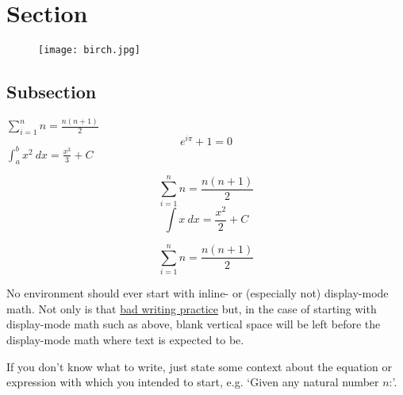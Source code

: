 \section{Section}

\lipsum[1-2]

\begin{figure}[h]
    \centering
    \texttt{[image: birch.jpg]}
\end{figure}

\subsection{Subsection}

\lipsum[][1-9]

\begin{defn}
    \lipsum[][1] \(\sum_{i=1}^{n} n = \frac{n(n+1)}{2}\) \lipsum[][2-3]
    \[e^{i\pi}+1 = 0\]
    \lipsum[][4] \(\int_{a}^{b} x^2 \ dx = \frac{x^3}{3} + C\) \lipsum[][5-6]
\end{defn}

\begin{nota}
    \lipsum[][1-3]
    \[\sum_{i=1}^{n} n = \frac{n(n+1)}{2}\]
    \lipsum[][4-5]
    \[\int x \ dx = \frac{x^2}{2} + C\]
    \lipsum[][6-7]
\end{nota}

\begin{defn}
    \[\sum_{i=1}^{n} n = \frac{n(n+1)}{2}\]
    \lipsum[][3-5]
\end{defn}

\begin{rmrk}
    No environment should ever start with inline- or (especially not) display-mode math. Not only is that \href{https://kconrad.math.uconn.edu/blurbs/proofs/writingtips.pdf}{bad writing practice} but, in the case of starting with display-mode math such as above, blank vertical space will be left before the display-mode math where text is expected to be.

    If you don't know what to write, just state some context about the equation or expression with which you intended to start, e.g. `Given any natural number \(n\):'.
\end{rmrk}

